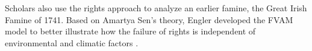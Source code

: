 Scholars also use the rights approach to analyze an earlier famine, the Great Irish Famine of 1741. Based on Amartya Sen's theory, Engler developed the FVAM model to better illustrate how the failure of rights is independent of environmental and climatic factors \citep{engler2013irish}.


\citep{mcgregor1992test}
